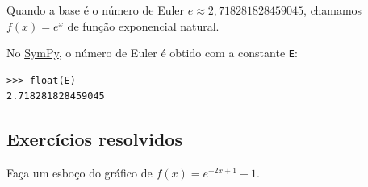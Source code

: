 \begin{obs}
  Quando a base é o número de Euler $e \approx 2,718281828459045$, chamamos $f(x) = e^x$ de função exponencial natural.

  \ifispython
  No \href{https://www.sympy.org}{SymPy}, o número de Euler é obtido com a constante \verb+E+:
\begin{verbatim}
>>> float(E)
2.718281828459045
\end{verbatim}
  \fi
\end{obs}

\subsection*{Exercícios resolvidos}

\begin{exeresol}
  Faça um esboço do gráfico de $f(x) = e^{-2x+1}-1$.
\end{exeresol}
